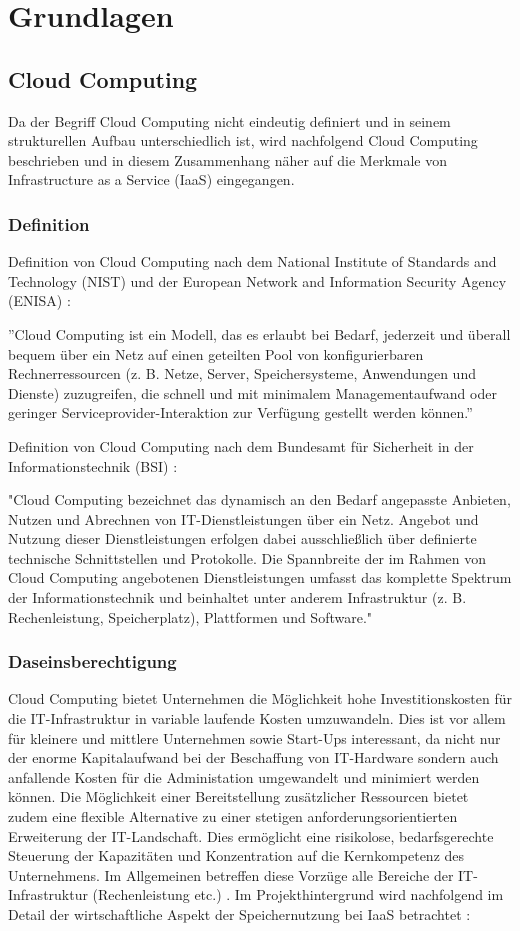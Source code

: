 \documentclass[13pt,a4paper,bibliography=totocnumbered,listof=totocnumbered]{scrartcl}
\begin{document}
\section{Grundlagen}\label{GrundlagenV}
\subsection{Cloud Computing}
Da der Begriff Cloud Computing nicht eindeutig definiert und in seinem strukturellen Aufbau unterschiedlich ist, wird nachfolgend Cloud Computing beschrieben und in diesem Zusammenhang näher auf die Merkmale von Infrastructure as a Service (IaaS) eingegangen.
\subsubsection{Definition}
Definition von Cloud Computing nach dem National Institute of Standards and Technology (NIST) und der European Network and Information Security Agency (ENISA) \cite{34}:

''Cloud Computing ist ein Modell, das es erlaubt bei Bedarf, jederzeit und überall bequem über ein Netz auf einen geteilten Pool von konfigurierbaren Rechnerressourcen (z. B. Netze, Server, Speichersysteme, Anwendungen und Dienste) zuzugreifen, die schnell und mit minimalem Managementaufwand oder geringer Serviceprovider-Interaktion zur Verfügung gestellt werden können.''

Definition von Cloud Computing nach dem Bundesamt für Sicherheit in der Informationstechnik (BSI) \cite{35}:

"Cloud Computing bezeichnet das dynamisch an den Bedarf angepasste Anbieten, Nutzen und Abrechnen von IT-Dienstleistungen über ein Netz. Angebot und Nutzung dieser Dienstleistungen erfolgen dabei ausschließlich über definierte technische Schnittstellen und Protokolle. Die Spannbreite der im Rahmen von Cloud Computing angebotenen Dienstleistungen umfasst das komplette Spektrum der Informationstechnik und beinhaltet unter anderem Infrastruktur (z. B. Rechenleistung, Speicherplatz), Plattformen und Software."

\subsubsection{Daseinsberechtigung}\label{CloudV}
Cloud Computing bietet Unternehmen die Möglichkeit hohe Investitionskosten für die IT-Infrastruktur in variable laufende Kosten umzuwandeln. Dies ist vor allem für kleinere und mittlere Unternehmen sowie Start-Ups interessant, da nicht nur der enorme Kapitalaufwand bei der Beschaffung von IT-Hardware sondern auch anfallende Kosten für die Administation umgewandelt und minimiert werden können. Die Möglichkeit einer Bereitstellung zusätzlicher Ressourcen bietet zudem eine flexible Alternative zu einer stetigen anforderungsorientierten Erweiterung der IT-Landschaft. Dies ermöglicht eine risikolose, bedarfsgerechte Steuerung der Kapazitäten und Konzentration auf die Kernkompetenz des Unternehmens. Im Allgemeinen betreffen diese Vorzüge alle Bereiche der IT-Infrastruktur (Rechenleistung etc.) \cite[S. 35]{39}. Im Projekthintergrund wird nachfolgend im Detail der wirtschaftliche Aspekt der Speichernutzung bei IaaS betrachtet \cite[S. 35 ff.]{39}:
\end{document}
